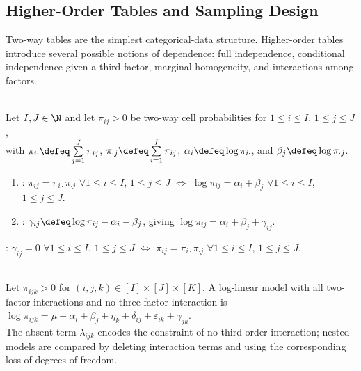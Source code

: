 \subsection{Higher-Order Tables and Sampling Design}

Two-way tables are the simplest categorical-data structure.  Higher-order tables introduce several possible notions of dependence: full independence, conditional independence given a third factor, marginal homogeneity, and interactions among factors.

\begin{definition} \label{def:two-way-log-linear-independence} \\
Let $I,J\in\N$ and let $\pi_{ij}>0$ be two-way cell probabilities for $1\leq i\leq I$, $1\leq j\leq J$,\\
with $\pi_{i\cdot}\defeq\sum\limits_{j=1}^{J}\pi_{ij}$, $\pi_{\cdot j}\defeq\sum\limits_{i=1}^{I}\pi_{ij}$, $\alpha_i\defeq\log\pi_{i\cdot}$, and $\beta_j\defeq\log\pi_{\cdot j}$.
\begin{enumerate}[label=(\roman*)]
\setlength{\itemsep}{0pt}
\item {}: $\pi_{ij}=\pi_{i\cdot}\pi_{\cdot j}$ $\forall 1\leq i\leq I$, $1\leq j\leq J$ $\Longleftrightarrow$ $\log\pi_{ij}=\alpha_i+\beta_j$ $\forall 1\leq i\leq I$, $1\leq j\leq J$.
\item {}: $\gamma_{ij}\defeq\log\pi_{ij}-\alpha_i-\beta_j$, giving $\log\pi_{ij}=\alpha_i+\beta_j+\gamma_{ij}$.
\end{enumerate}
: $\gamma_{ij}=0$ $\forall 1\leq i\leq I$, $1\leq j\leq J$ $\Longleftrightarrow$ $\pi_{ij}=\pi_{i\cdot}\pi_{\cdot j}$ $\forall 1\leq i\leq I$, $1\leq j\leq J$.
\end{definition}

\begin{remark} \label{rem:three-way-log-linear-models} \\
Let $\pi_{ijk}>0$ for $(i,j,k)\in[I]\times[J]\times[K]$. A log-linear model with all two-factor interactions and no three-factor interaction is $\log\pi_{ijk}=\mu+\alpha_i+\beta_j+\eta_k+\delta_{ij}+\varepsilon_{ik}+\gamma_{jk}$.\\
The absent term $\lambda_{ijk}$ encodes the constraint of no third-order interaction; nested models are compared by deleting interaction terms and using the corresponding loss of degrees of freedom.
\end{remark}

